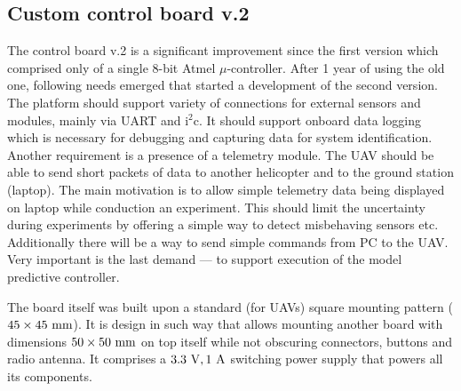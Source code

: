 \subsection{Custom control board v.2}

The control board v.2 is a significant improvement since the first version \citep{baca2013} which comprised only of a single 8-bit Atmel $\mu$-controller. After 1 year of using the old one, following needs emerged that started a development of the second version. The platform should support variety of connections for external sensors and modules, mainly via UART and $\mathrm{i}^2\mathrm{c}$. It should support onboard data logging which is necessary for debugging and capturing data for system identification. Another requirement is a presence of a telemetry module. The UAV should be able to send short packets of data to another helicopter and to the ground station (laptop). The main motivation is to allow simple telemetry data being displayed on laptop while conduction an experiment. This should limit the uncertainty during experiments by offering a simple way to detect misbehaving sensors etc. Additionally there will be a way to send simple commands from PC to the UAV. Very important is the last demand --- to support execution of the model predictive controller.

The board itself was built upon a standard (for UAVs) square mounting pattern ($45\times 45~\mathrm{mm}$). It is design in such way that allows mounting another board with dimensions $50\times 50~\mathrm{mm}$ on top itself while not obscuring connectors, buttons and radio antenna. It comprises a $3.3~\mathrm{V}, 1~\mathrm{A}$ switching power supply that powers all its components.

